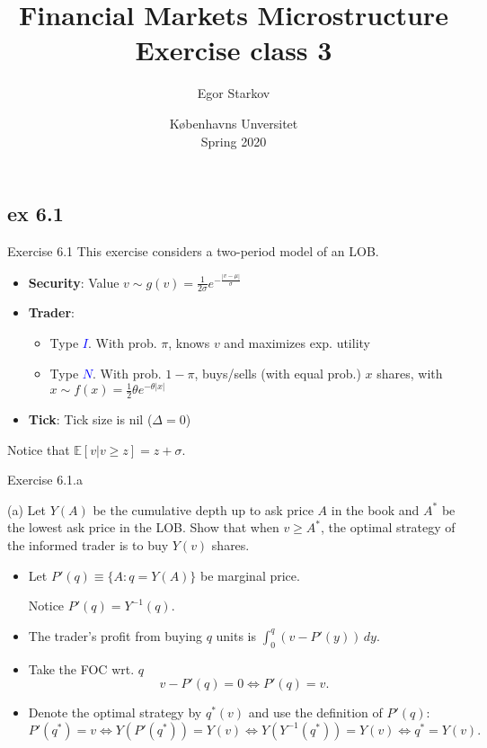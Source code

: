 \documentclass[english,10pt
,aspectratio=169
]{beamer}
\title{Financial Markets Microstructure \\ Exercise class 3}
\author{Egor Starkov}
\date{K{\o}benhavns Unversitet \\
	Spring 2020}
\begin{document}
\subsection{ex 6.1}

\begin{frame}[label=ex1]{Exercise 6.1}
	This exercise considers a two-period model of an LOB.
	\begin{itemize}
		\item \textbf{Security}: Value $v \sim g(v)=\frac{1}{2\sigma} e^{-\frac{|v-\mu|}{\sigma}}$
		\item \textbf{Trader}: 
		\begin{itemize}
			\item Type \textcolor{blue}{$I$}. With prob. $\pi$, knows $v$ and maximizes exp. utility
			\item Type \textcolor{blue}{$N$}. With prob. $1-\pi$, buys/sells (with equal prob.) $x$ shares, with $x \sim f(x)=\frac{1}{2}\theta e^{-\theta |x|}$ 
		\end{itemize}
		\item \textbf{Tick}: Tick size is nil ($\Delta=0$)
	\end{itemize}
	Notice that $\mathbb{E}[v|v \ge z]=z+\sigma$.
\end{frame}


\begin{frame}{Exercise 6.1.a}
	\begin{exampleblock}{}
		(a) Let $Y(A)$ be the cumulative depth up to ask price $A$ in the book and $A^*$ be the lowest ask price in the LOB. Show that when $v \ge A^*$, the optimal strategy of the informed trader is to buy $Y(v)$ shares.
	\end{exampleblock}

	\pause

	\begin{itemize}
		\item Let $P'(q) \equiv \{A: q=Y(A)\}$ be marginal price.
		
		Notice $P'(q) = Y^{-1}(q)$.
		\item The trader's profit from buying $q$ units is $\int_0^q (v-P'(y)) \, dy.$
		\item Take the FOC wrt. $q$
		\[
		v-P'(q)=0 \Leftrightarrow P'(q)=v.
		\]
		\item Denote the optimal strategy by $q^*(v)$ and use the definition of $P'(q)$:
		\[
		P'(q^*)=v \Leftrightarrow Y(P'(q^*))=Y(v) \Leftrightarrow Y(Y^{-1}(q^*))=Y(v) \Leftrightarrow q^*= Y(v).
		\]
	\end{itemize}
\end{frame}
\end{document}
